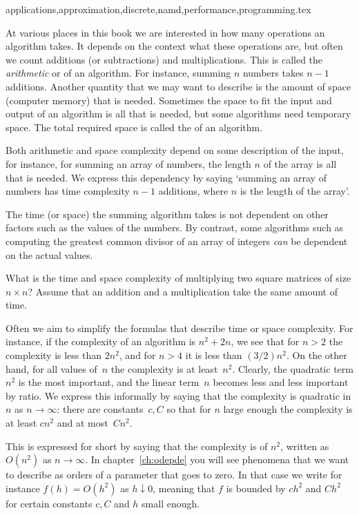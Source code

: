 {applications,approximation,discrete,namd,performance,programming}.tex%

At various places in this book we are interested in how many
operations an algorithm takes. It depends on the context what these
operations are, but often we count additions (or subtractions) and
multiplications. This is called the \emph{arithmetic} or
of an algorithm. For
instance, summing $n$ numbers takes $n-1$ additions.  Another quantity
that we may want to describe is the amount of space (computer memory)
that is needed. Sometimes the space to fit the input and output of an
algorithm is all that is needed, but some algorithms need temporary
space. The total required space is called the
of an algorithm.

Both arithmetic and space complexity depend on some description of the
input, for instance, for summing an array of numbers, the length $n$
of the array is all that is needed. We express this dependency by
saying `summing an array of numbers has time complexity $n-1$
additions, where $n$ is the length of the array'.

The time (or space) the summing algorithm takes is not dependent on
other factors such as the values of the numbers.  By contrast, some
algorithms such as computing the greatest common divisor of an array
of integers \emph{can} be dependent on the actual values.

\begin{exercise}
  What is the time and space complexity of multiplying two square
  matrices of size $n\times n$? Assume that an addition and a
  multiplication take the same amount of time.
\end{exercise}

Often we aim to simplify the formulas that describe time or space
complexity. For instance, if the complexity of an algorithm is
$n^2+2n$, we see that for $n>2$ the complexity is less than $2n^2$,
and for $n>4$ it is less than $(3/2)n^2$. On the other hand, for all
values of~$n$ the complexity is at least~$n^2$.  Clearly, the
quadratic term $n^2$ is the most important, and the linear term~$n$
becomes less and less important by ratio. We express this informally
by saying that the complexity is quadratic in $n$ as
$n\rightarrow\infty$: there are constants~$c,C$ so that for $n$ large
enough the complexity is at least $cn^2$ and at most~$Cn^2$. 

This is
expressed for short by saying that the complexity is of
 $n^2$, written as~$O(n^2)$ as
$n\rightarrow\infty$. In
chapter~\ref{ch:odepde} you will see phenomena that we want to
describe as orders of a parameter that goes to zero. In that case we
write for instance $f(h)=O(h^2)$ as $h\downarrow0$, meaning that $f$
is bounded by $ch^2$ and $Ch^2$ for certain constants $c,C$ and $h$
small enough.

